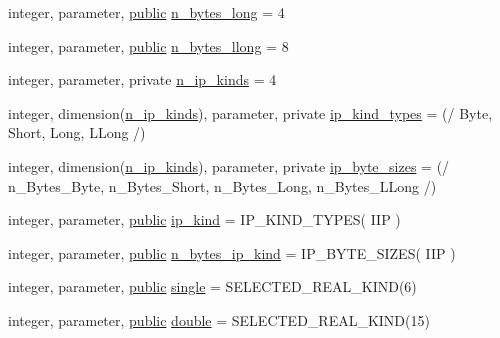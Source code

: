 \begin{DoxyCompactItemize}
integer, parameter, \hyperlink{M__stopwatch_83_8txt_a2f74811300c361e53b430611a7d1769f}{public} \hyperlink{namespacem__compare__float__numbers_a6295d4185db12b4e3d14c67de6164dd4}{n\+\_\+bytes\+\_\+long} = 4
\item 
integer, parameter, \hyperlink{M__stopwatch_83_8txt_a2f74811300c361e53b430611a7d1769f}{public} \hyperlink{namespacem__compare__float__numbers_a2c4b39b521fa4fe5ea36044ddbbbb2ba}{n\+\_\+bytes\+\_\+llong} = 8
\item 
integer, parameter, private \hyperlink{namespacem__compare__float__numbers_a6cbe22bf2f7aa1ada923de776f8258bf}{n\+\_\+ip\+\_\+kinds} = 4
\item 
integer, dimension(\hyperlink{namespacem__compare__float__numbers_a6cbe22bf2f7aa1ada923de776f8258bf}{n\+\_\+ip\+\_\+kinds}), parameter, private \hyperlink{namespacem__compare__float__numbers_a18a2ec0b5b6a904a6ccd63fad576f759}{ip\+\_\+kind\+\_\+types} = (/ Byte, Short, Long, L\+Long /)
\item 
integer, dimension(\hyperlink{namespacem__compare__float__numbers_a6cbe22bf2f7aa1ada923de776f8258bf}{n\+\_\+ip\+\_\+kinds}), parameter, private \hyperlink{namespacem__compare__float__numbers_aee1b5dea82ea1e760308976a08df6356}{ip\+\_\+byte\+\_\+sizes} = (/ n\+\_\+\+Bytes\+\_\+\+Byte, n\+\_\+\+Bytes\+\_\+\+Short, n\+\_\+\+Bytes\+\_\+\+Long, n\+\_\+\+Bytes\+\_\+\+L\+Long /)
\item 
integer, parameter, \hyperlink{M__stopwatch_83_8txt_a2f74811300c361e53b430611a7d1769f}{public} \hyperlink{namespacem__compare__float__numbers_a932ca5131dba16f9e2d30e75cf79b574}{ip\+\_\+kind} = I\+P\+\_\+\+K\+I\+N\+D\+\_\+\+T\+Y\+P\+ES( I\+IP )
\item 
integer, parameter, \hyperlink{M__stopwatch_83_8txt_a2f74811300c361e53b430611a7d1769f}{public} \hyperlink{namespacem__compare__float__numbers_a868bf02722b9070cff22ba7803aeffed}{n\+\_\+bytes\+\_\+ip\+\_\+kind} = I\+P\+\_\+\+B\+Y\+T\+E\+\_\+\+S\+I\+Z\+ES( I\+IP )
\item 
integer, parameter, \hyperlink{M__stopwatch_83_8txt_a2f74811300c361e53b430611a7d1769f}{public} \hyperlink{namespacem__compare__float__numbers_a5f122d46d6ad7d1cf0b899d9c855c498}{single} = S\+E\+L\+E\+C\+T\+E\+D\+\_\+\+R\+E\+A\+L\+\_\+\+K\+I\+ND(6)
\item 
integer, parameter, \hyperlink{M__stopwatch_83_8txt_a2f74811300c361e53b430611a7d1769f}{public} \hyperlink{namespacem__compare__float__numbers_af4b789cd6e1a2abcd412eaf29e91ea0c}{double} = S\+E\+L\+E\+C\+T\+E\+D\+\_\+\+R\+E\+A\+L\+\_\+\+K\+I\+ND(15)
\item 

\end{DoxyCompactItemize}
